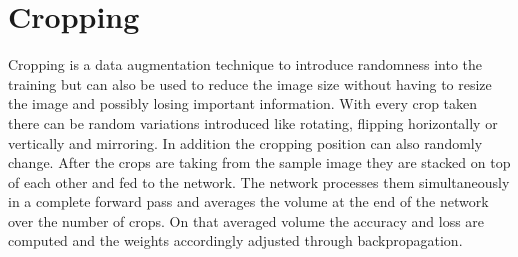 \begin{table}[h]
    \caption{Different dataset variations. C stands for cleaned, CH stands fro cleaned heavily, B stands for balanced and EXTENDED stand for the variation where the validation images have additionally been copied into the training.}
    \centering
    \begin{small}
    \textsc{
    }
    \end{small}
    \vspace{-3.9mm}
    \label{tbl:dataset-variations}
\end{table}

\section{Cropping}

Cropping is a data augmentation technique to introduce randomness into the training but can also be used to reduce the image size without having to resize the image and possibly losing important information. With every crop taken there can be random variations introduced like rotating, flipping horizontally or vertically and mirroring. In addition the cropping position can also randomly change. After the crops are taking from the sample image they are stacked on top of each other and fed to the network. The network processes them simultaneously in a complete forward pass and averages the volume at the end of the network over the number of crops. On that averaged volume the accuracy and loss are computed and the weights accordingly adjusted through backpropagation.

